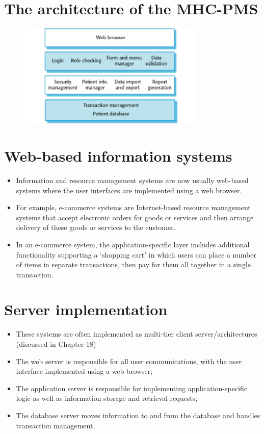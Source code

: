 \newpage
\section{The architecture of the MHC-PMS}
\begin{figure}[h!]
    \centering
    \includegraphics[width = 0.8\textwidth]{./figures/L3_12.png}
    \caption{}
    \label{fig:L3_12}
\end{figure}

\section{Web-based information systems}
\begin{itemize}
\item Information and resource management systems are now usually web-based systems where the user interfaces are implemented using a web browser.

\item For example, e-commerce systems are Internet-based resource management systems that accept electronic orders for goods or services and then arrange delivery of these goods or services to the customer.

\item In an e-commerce system, the application-specific layer includes additional functionality supporting a ‘shopping cart’ in which users can place a number of items in separate transactions, then pay for them all together in a single transaction.

\end{itemize}
\section{Server implementation}
\begin{itemize}
\item These systems are often implemented as multi-tier client server/architectures (discussed in Chapter 18)

 \item The web server is responsible for all user communications, with the user interface implemented using a web browser;
 \item The application server is responsible for implementing application-specific logic as well as information storage and retrieval requests;
 \item The database server moves information to and from the database and handles transaction management.


\end{itemize}
